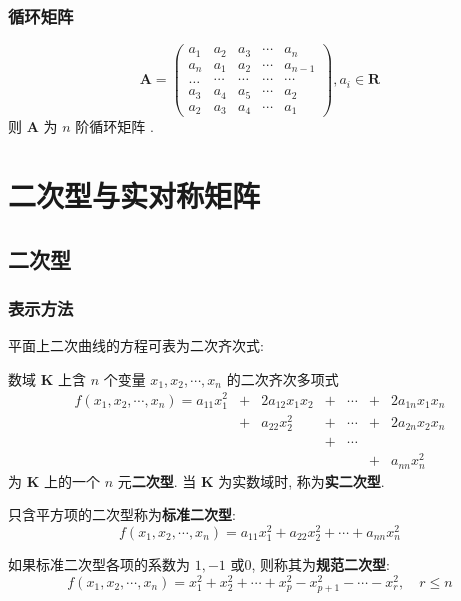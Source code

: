 \documentclass{article}
\begin{document}
				\subsubsection{循环矩阵}
				$$
				\boldsymbol A=\left(\begin{array}{ccccc}
					a_{1} & a_{2} & a_{3} & \cdots & a_{n} \\
					a_{n} & a_{1} & a_{2} & \cdots & a_{n-1} \\
					\ldots & \cdots & \cdots & \cdots & \cdots \\
					a_{3} & a_{4} & a_{5} & \cdots & a_{2} \\
					a_{2} & a_{3} & a_{4} & \cdots & a_{1}
				\end{array}\right), a_{i} \in \mathbf{R}
				$$
				则 $\boldsymbol A$ 为 $n$ 阶循环矩阵 .
	\section{二次型与实对称矩阵}
		\subsection{二次型}
			\subsubsection{表示方法}
				平面上二次曲线的方程可表为二次齐次式:

				数域 $\mathbf K$ 上含 $n$ 个变量 $x_{1}, x_{2}, \cdots, x_{n}$ 的二次齐次多项式
				$$
				\begin{array}{rcccccc}
					f\left(x_{1}, x_{2}, \cdots, x_{n}\right)=a_{11} x_{1}^{2}&+&2 a_{12} x_{1} x_{2}&+&\cdots&+&2 a_{1 n} x_{1} x_{n} \\
					&+&a_{22} x_{2}^{2}&+&\cdots&+&2 a_{2 n} x_{2} x_{n} \\
					& & &+&\cdots & & \\
					& & & & &+&a_{n n} x_{n}^{2}
				\end{array}
				$$
				为 $\mathbf K$ 上的一个 $n$ 元\textbf{二次型}. 当 $\mathbf K$ 为实数域时, 称为\textbf{实二次型}.

				只含平方项的二次型称为\textbf{标准二次型}:
				$$
				f\left(x_{1}, x_{2}, \cdots, x_{n}\right)=a_{11} x_{1}^{2}+a_{22} x_{2}^{2}+\cdots+a_{n n} x_{n}^{2}
				$$

				如果标准二次型各项的系数为 $1,-1$ 或0, 则称其为\textbf{规范二次型}:
				$$
				f\left(x_{1}, x_{2}, \cdots, x_{n}\right)=x_{1}^{2}+x_{2}^{2}+\cdots+x_{p}^{2}-x_{p+1}^{2}-\cdots-x_{r}^{2}, \quad r \leqslant n
				$$
\end{document}
